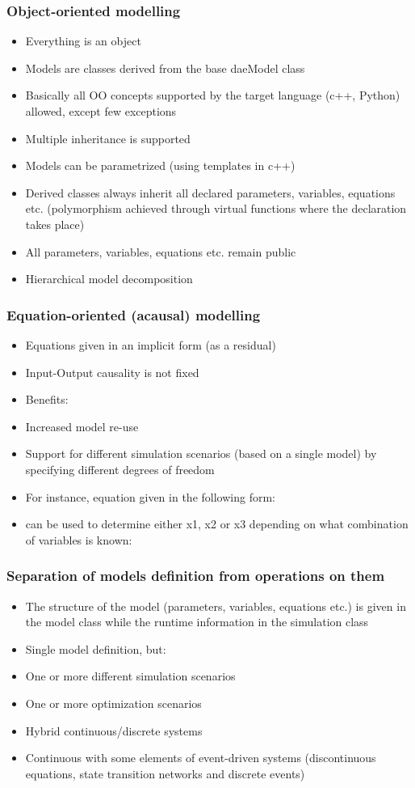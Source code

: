\documentclass{beamer}
\begin{document}
\begin{frame}
\frametitle{Object-oriented modelling}
\begin{itemize}
  \item Everything is an object
  \item Models are classes derived from the base daeModel class
  \item Basically all OO concepts supported by the target language (c++, Python) allowed, except few exceptions
  \item Multiple inheritance is supported
  \item Models can be parametrized (using templates in c++)
  \item Derived classes always inherit all declared parameters, variables, equations etc. (polymorphism achieved through virtual functions where the declaration takes place)
  \item All parameters, variables, equations etc. remain public
  \item Hierarchical model decomposition
\end{itemize}
\end{frame}

\begin{frame}
\frametitle{Equation-oriented (acausal) modelling}
\begin{itemize}
  \item Equations given in an implicit form (as a residual)
  \item Input-Output causality is not fixed
  \item Benefits:
  \item Increased model re-use
  \item Support for different simulation scenarios (based on a single model) by specifying different degrees of freedom
  \item For instance, equation given in the following form:

  \item can be used to determine either x1, x2 or x3 depending on what combination of variables is known:
\end{itemize}
\end{frame}

\begin{frame}
\frametitle{Separation of models definition from operations on them}
\begin{itemize}
  \item The structure of the model (parameters, variables, equations etc.) is given in the model class while the runtime information in the simulation class 
  \item Single model definition, but:
  \item One or more different simulation scenarios
  \item One or more optimization scenarios
  \item Hybrid continuous/discrete systems 
  \item Continuous with some elements of event-driven systems (discontinuous equations, state transition networks and discrete events)
\end{itemize}
\end{frame}
\end{document}
